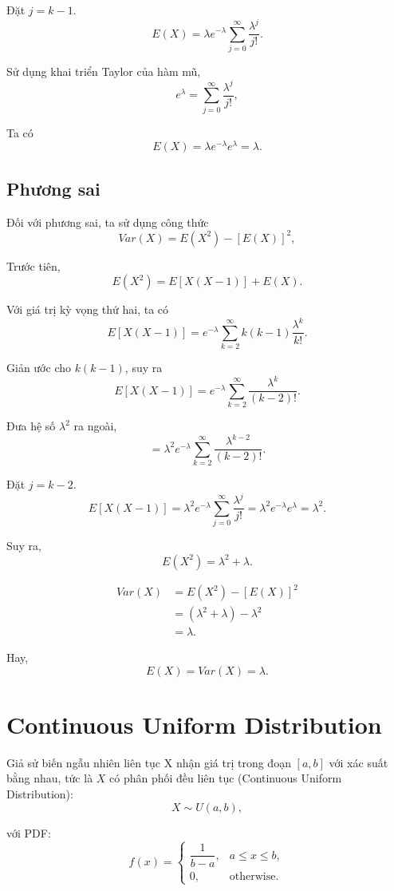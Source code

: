 Đặt $j=k-1.$
\[
E(X)
=
\lambda
e^{-\lambda}
\sum_{j=0}^{\infty}
\frac{\lambda^j}{j!}.
\]

Sử dụng khai triển Taylor của hàm mũ,
\[
e^\lambda
=
\sum_{j=0}^{\infty}
\frac{\lambda^j}{j!},
\]

Ta có
\[
E(X)
=
\lambda
e^{-\lambda}
e^\lambda
=
\boxed{\lambda}.
\]

\subsection*{Phương sai}
Đối với phương sai, ta sử dụng công thức
\[
Var(X)
=
E(X^2)-[E(X)]^2,
\]

Trước tiên,
\[
E(X^2)
=
E[X(X-1)]
+
E(X).
\]

Với giá trị kỳ vọng thứ hai, ta có
\[
E[X(X-1)]
=
e^{-\lambda}
\sum_{k=2}^{\infty}
k(k-1)
\frac{\lambda^k}{k!}.
\]

Giản ước cho $k(k-1)$, suy ra
\[
E[X(X-1)]
=
e^{-\lambda}
\sum_{k=2}^{\infty}
\frac{\lambda^k}{(k-2)!}.
\]

Đưa hệ số $\lambda^2$ ra ngoài,
\[
=
\lambda^2
e^{-\lambda}
\sum_{k=2}^{\infty}
\frac{\lambda^{k-2}}{(k-2)!}.
\]

Đặt $j=k-2.$
\[
E[X(X-1)]
=
\lambda^2
e^{-\lambda}
\sum_{j=0}^{\infty}
\frac{\lambda^j}{j!}
= \lambda^2
e^{-\lambda} e^{\lambda}
= \lambda^2.
\]

Suy ra,
\[
E(X^2)
=
\lambda^2+\lambda.
\]

\[
\begin{aligned}
Var(X)
&=
E(X^2)-[E(X)]^2\\
&=
(\lambda^2+\lambda)-\lambda^2\\
&=
\boxed{\lambda}.
\end{aligned}
\]

Hay,
\[
\boxed{
E(X)=Var(X)=\lambda.
}
\]

\section{Continuous Uniform Distribution}
\label{sec:Proof_Continuous_Uniform}
Giả sử biến ngẫu nhiên liên tục X nhận giá trị trong đoạn \([a,b]\) với xác suất bằng nhau, tức là \(X\) có phân phối đều liên tục (Continuous Uniform Distribution):
\[
X\sim U(a,b),
\]

với PDF:
\[
f(x)=
\begin{cases}
\dfrac{1}{b-a}, & a\le x\le b,\\
0, & \text{otherwise.}
\end{cases}
\]

